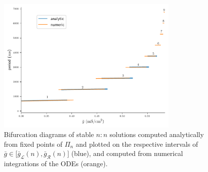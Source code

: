 \documentclass[utf8]{frontiersFPHY} %
\newcommand{\gbar}{\bar g}
\begin{document}
\begin{figure}[h!]
  \centering
  \includegraphics[width=0.8\textwidth]{final-bif}
  \caption{Bifurcation diagrams of stable $n:n$ solutions computed analytically from
    fixed points of $\Pi_n$ and plotted on the respective intervals of $\gbar\in
    \big[\gbar_{\mathcal{L}}(n),\gbar_{\mathcal{R}}(n)\big]$ (blue), and computed from numerical integrations of the ODEs (orange).~\label{fig:final-bif}}
\end{figure}
\end{document}
